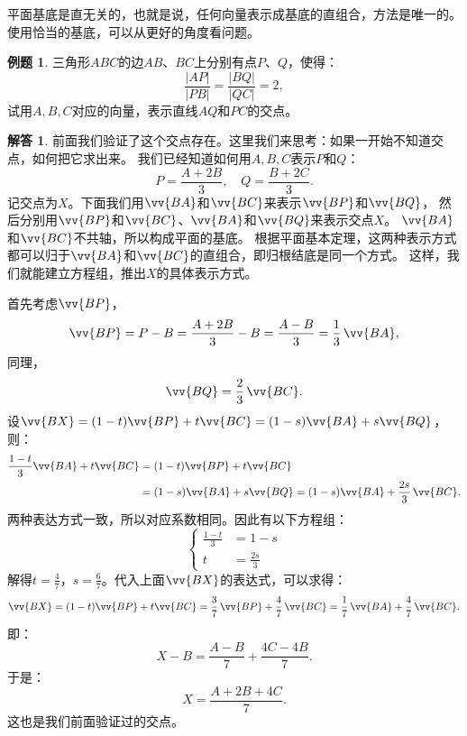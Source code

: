 \documentclass[12pt,UTF8]{ctexbook}
\theoremstyle{definition}
\newtheorem{et}{例题}[section]
\newtheorem*{so}{解答}
\theoremstyle{plain}
\begin{document}
平面基底是直无关的，也就是说，任何向量表示成基底的直组合，方法是唯一的。
使用恰当的基底，可以从更好的角度看问题。

\begin{et}\label{et:0-0-20}
    三角形$ABC$的边$AB$、$BC$上分别有点$P$、$Q$，使得：
    $$ \frac{|AP|}{|PB|} = \frac{|BQ|}{|QC|} = 2,$$
    试用$A,B,C$对应的向量，表示直线$AQ$和$PC$的交点。
\end{et}
\begin{so}
    前面我们验证了这个交点存在。这里我们来思考：如果一开始不知道交点，如何把它求出来。
    我们已经知道如何用$A,B,C$表示$P$和$Q$：
    $$ P = \frac{A + 2B}{3}, \quad Q = \frac{B + 2C}{3}. $$
    记交点为$X$。下面我们用$\vv{BA}$和$\vv{BC}$来表示$\vv{BP}$和$\vv{BQ}$，
    然后分别用$\vv{BP}$和$\vv{BC}$、$\vv{BA}$和$\vv{BQ}$来表示交点$X$。
    $\vv{BA}$和$\vv{BC}$不共轴，所以构成平面的基底。
    根据平面基本定理，这两种表示方式都可以归于$\vv{BA}$和$\vv{BC}$的直组合，即归根结底是同一个方式。
    这样，我们就能建立方程组，推出$X$的具体表示方式。

    首先考虑$\vv{BP}$，
    $$\vv{BP} = P - B = \frac{A + 2B}{3} - B = \frac{A - B}{3} = \frac13 \, \vv{BA},$$
    同理，
    $$\vv{BQ} = \frac23 \, \vv{BC}.$$
    设$\vv{BX} = (1 - t)\vv{BP} + t\vv{BC} = (1 - s)\vv{BA} + s\vv{BQ}$，则：
    \begin{align*}
        \frac{1 - t}{3}\vv{BA} + t\vv{BC} &= (1 - t)\vv{BP} + t\vv{BC}  \\
        &= (1 - s)\vv{BA} + s\vv{BQ} = (1 - s)\vv{BA} + \frac{2s}{3}\,\vv{BC}.  
    \end{align*}
    两种表达方式一致，所以对应系数相同。因此有以下方程组：
    $$
    \left\{
    \begin{array}{ll}
        \frac{1 - t}{3} &= 1 - s \\
        t &= \frac{2s}{3}
    \end{array}
    \right.
    $$
    解得$t = \frac{4}{7}$，$s = \frac{6}{7}$。代入上面$\vv{BX}$的表达式，可以求得：
    $$\vv{BX} = (1 - t)\vv{BP} + t\vv{BC} = \frac{3}{7} \, \vv{BP} + \frac{4}{7} \, \vv{BC} = \frac17 \, \vv{BA} + \frac{4}{7} \, \vv{BC}. $$
    即：
    $$ X - B = \frac{A - B}{7} + \frac{4C - 4B}{7}.$$
    于是：
    $$ X = \frac{A + 2B + 4C}{7}.$$
    这也是我们前面验证过的交点。    
\end{so}
\end{document}
